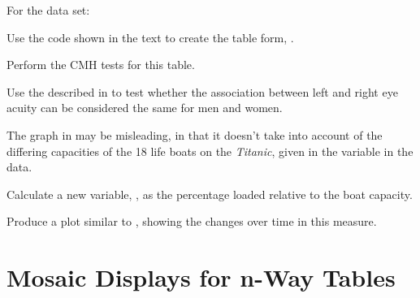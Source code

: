 \documentclass[10pt]{report}\usepackage[]{graphicx}\usepackage[]{color}
\begin{document}
\begin{Exercises}
\begin{enumerate*}
     \end{enumerate*}

  \exercise For the  data set:
    \begin{enumerate*}
      \item Use the code shown in the text to create the table form, .
      \begin{ans}
      \end{ans}
      
      \item Perform the CMH tests for this table.
      \begin{ans}
      \end{ans}
      
      \item Use the  described in  to
      test whether the association between left and right eye acuity can be
      considered the same for men and women.
      \begin{ans}
      \end{ans}
      
    \end{enumerate*}

  \exercise The graph in  may be misleading, in that it doesn't
  take into account of the differing capacities of the 18 life boats on the
  \emph{Titanic}, given in the variable  in the  data.
    \begin{enumerate*}
      \item Calculate a new variable, , as the percentage
      loaded relative to the boat capacity.
      \begin{ans}
      \end{ans}
      
      \item Produce a plot similar to , showing the
      changes over time in this measure.
      \begin{ans}
      \end{ans}
      
    \end{enumerate*}

\end{Exercises}

\chapter[Mosaic Displays for n-Way Tables]{Mosaic Displays for n-Way \mbox{Tables}}\label{ch:mosaic}
\end{document}
